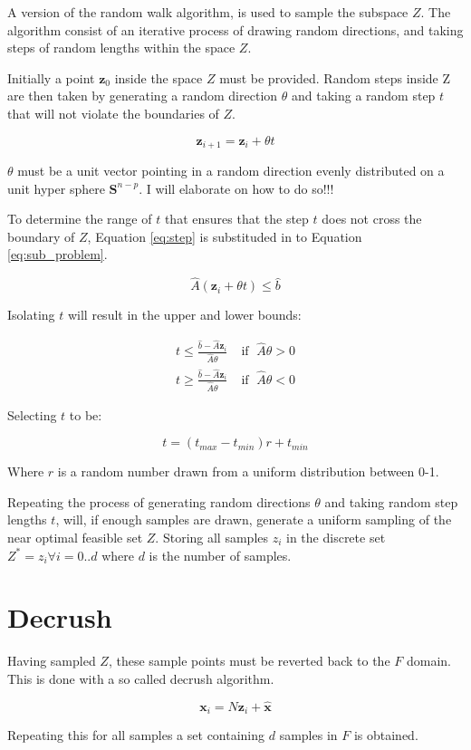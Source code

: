\documentclass[11pt,a4paper,english]{article}
\begin{document}
A version of the random walk algorithm, is used to sample the subspace $Z$. The algorithm consist of an iterative process of drawing random directions, and taking steps of random lengths within the space $Z$. 

Initially a point $\mathbf{z}_0$ inside the space $Z$ must be provided. Random steps inside Z are then taken by generating a random direction $\theta$ and taking a random step $t$ that will not violate the boundaries of $Z$. 

\begin{equation}\label{eq:step}
	\mathbf{z}_{i+1} = \mathbf{z}_i + \theta t
\end{equation}

$\theta$ must be a unit vector pointing in a random direction evenly distributed on a unit hyper sphere $\mathbf{S}^{n-p}$. I will elaborate on how to do so!!!

To determine the range of $t$ that ensures that the step $t$ does not cross the boundary of $Z$, Equation \ref{eq:step} is substituded in to Equation \ref{eq:sub_problem}.

\begin{equation}
	\hat{A}(\mathbf{z}_i + \theta t) \leq \hat{b}
\end{equation}

Isolating $t$ will result in the upper and lower bounds:

\begin{align}
t \leq \frac{\hat{b}-\hat{A}\mathbf{z}_i}{\hat{A}\theta}& \; \text{if }  \; \hat{A}\theta>0\\
t \geq \frac{\hat{b}-\hat{A}\mathbf{z}_i}{\hat{A}\theta}& \; \text{if }  \; \hat{A}\theta<0
\end{align}

Selecting $t$ to be:

\begin{equation}
	t = (t_{max}-t_{min})r+t_{min}
\end{equation}

Where $r$ is a random number drawn from a uniform distribution between 0-1. 

Repeating the process of generating random directions $\theta$ and taking random step lengths $t$, will, if enough samples are drawn, generate a uniform sampling of the near optimal feasible set $Z$. Storing all samples $z_i$ in the discrete set $Z^* = {z_i \forall i=0..d}$ where $d$ is the number of samples.

\section{Decrush}

Having sampled $Z$, these sample points must be reverted back to the $F$ domain. This is done with a so called decrush algorithm. 

\begin{equation}
	\mathbf{x}_i = N \mathbf{z}_i + \mathbf{\hat{x}}
\end{equation}

Repeating this for all samples a set containing $d$ samples in $F$ is obtained. 


\clearpage
\printbibliography
\end{document}
